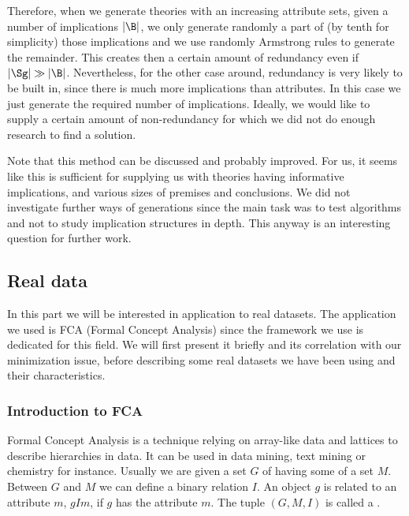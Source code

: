 \noindent Therefore, when we generate theories with an increasing attribute sets, given a number of implications $|\B|$, we only generate randomly a part of (by tenth for simplicity) those implications and we use randomly Armstrong rules to generate the remainder. This creates then a certain amount of redundancy even if $|\Sg| \gg |\B|$. Nevertheless, for the other case around, redundancy is very likely to be built in, since there is much more implications than attributes. In this case we just generate the required number of implications. Ideally, we would like to supply a certain amount of non-redundancy for which we did not do enough research to find a solution. 

\vspace{1.2em}

Note that this method can be discussed and probably improved. For us,
it seems like this is sufficient for supplying us with theories having informative implications, and various sizes of premises and conclusions. We did not investigate further ways of generations since the main task was to test algorithms and not to study implication structures in depth. This anyway is an interesting question for further work.

\subsection{Real data}

In this part we will be interested in application to real datasets. The application we used is FCA (Formal Concept Analysis) since the framework we use is dedicated for this field. We will first present it briefly and its correlation with our minimization issue, before describing some real datasets we have been using and their characteristics.

\subsubsection{Introduction to FCA}

Formal Concept Analysis is a technique relying on array-like data and lattices
to describe hierarchies in data. It can be used in data mining, text mining or
chemistry for instance. Usually we are given a set $G$ of  having some  of a set $M$. Between $G$ and $M$ we can define
a binary relation $I$. An object $g$ is related to an attribute $m$, $gIm$, if
$g$ has the attribute $m$. The tuple $(G, M, I)$ is called a .

